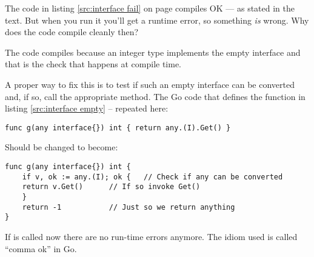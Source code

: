 \begin{Exercise}[title={Interfaces and compilation},difficulty=1]
\Question
The code in listing \ref{src:interface fail} on page
\pageref{src:interface fail} compiles OK --- as stated 
in the text. But when you run it you'll get a runtime error, so
something \emph{is} wrong. Why does the code compile cleanly then?
\end{Exercise}

\begin{Answer}
\Question
The code compiles because an integer type implements the empty interface
and that is the check that happens at compile time.

A proper way to fix this is to test if such an empty interface can
be converted and, if so, call the appropriate method. The Go code
that defines the function  in listing \ref{src:interface empty}
-- repeated here:
\begin{lstlisting}
func g(any interface{}) int { return any.(I).Get() }
\end{lstlisting}

\noindent{}Should be changed to become:
\begin{lstlisting}
func g(any interface{}) int {
    if v, ok := any.(I); ok {	// Check if any can be converted
	return v.Get()		// If so invoke Get()
    }
    return -1			// Just so we return anything
}
\end{lstlisting}
If  is called now there are no run-time errors anymore. The
idiom used is called ``comma ok'' in Go.
\end{Answer}

